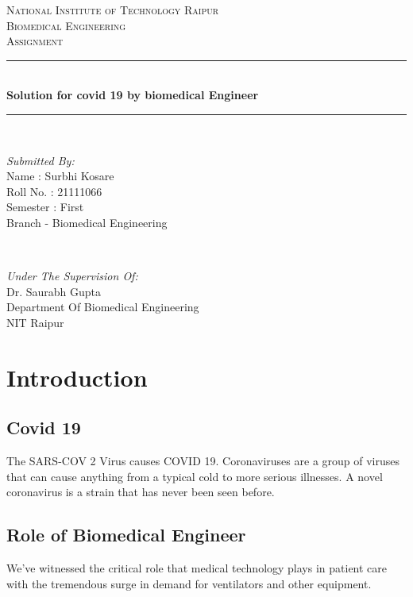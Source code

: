 \documentclass[12pt]{article}
\begin{document}
\begin{titlepage}
\newcommand{\HRule}{\rule{\linewidth}{0.5mm}}
\center
\textsc{\LARGE National Institute of Technology Raipur}\\[1.0cm]

\textsc{\Large Biomedical Engineering}\\[0.5cm] 
\textsc{\large Assignment}\\[0.5cm]
\HRule\\[0.4cm]
	
	{\huge\bfseries Solution for covid 19 by biomedical Engineer}\\[0.1cm]
	\HRule\\[1.1cm]
	\begin{minipage}{0.4\textwidth}
		\begin{flushleft}
			\large
			\textit{Submitted By:}\\
          		Name : Surbhi Kosare \\
			   Roll No. : 21111066\\
			   Semester : First\\
			   Branch - Biomedical Engineering 
			   
			\end{flushleft}
	\end{minipage}
	~
	\begin{minipage}{0.5\textwidth}
		\begin{flushright}
			\large
			\textit{Under The Supervision Of:}\\
			Dr. Saurabh Gupta\\
			Department Of Biomedical Engineering\\
			NIT Raipur
		\end{flushright}
	\end{minipage}
	\vfill\vfill\vfill 
	
	
	\vfill 
\end{titlepage}

\section{Introduction}
\subsection{Covid 19}
The SARS-COV 2 Virus causes COVID 19. Coronaviruses are a group of viruses that can cause anything from a typical cold to more serious illnesses. A novel coronavirus is a strain that has never been seen before.
\subsection{Role of Biomedical Engineer}
We've witnessed the critical role that medical technology plays in patient care with the tremendous surge in demand for ventilators and other equipment.
\end{document}
